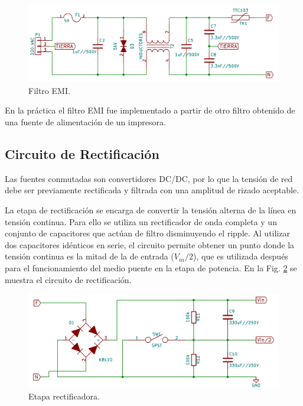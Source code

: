 \documentclass[11pt, a4paper]{article}
\begin{document}
\begin{figure}[h]
	\centering
	\includegraphics[width = \textwidth]{Imagenes/emi}
	\caption{Filtro EMI.}
	\label{emi}
\end{figure}

En la práctica el filtro EMI fue implementado a partir de otro filtro obtenido de una fuente de alimentación de un impresora.

\subsection{Circuito de Rectificación}
Las fuentes conmutadas son convertidores DC/DC, por lo que la tensión de red debe ser previamente rectificada y filtrada con una amplitud de rizado aceptable.

La etapa de rectificación se encarga de convertir la tensión alterna de la línea en tensión continua. Para ello se utiliza un rectificador de onda completa y un conjunto de capacitores que actúan de filtro disminuyendo el ripple. Al utilizar dos capacitores idénticos en serie, el circuito permite obtener un punto donde la tensión continua es la mitad de la de entrada ($V_{in}/2$), que es utilizada después para el funcionamiento del medio puente en la etapa de potencia. En la Fig. \ref{rectificador} se muestra el circuito de rectificación.

\begin{figure}[h]
	\centering
	\includegraphics[width = \textwidth]{Imagenes/rectificador}
	\caption{Etapa rectificadora.}
	\label{rectificador}
\end{figure}
\end{document}
